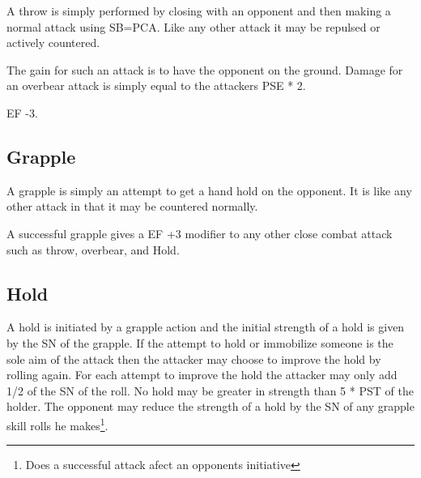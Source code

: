 A throw is simply performed by closing with an opponent and then 
making a normal attack using SB=PCA. Like any other attack it may be 
repulsed or actively countered.

The gain for such an attack is to have the opponent on the ground.
Damage for an overbear attack is simply equal to the attackers 
PSE * 2. 

EF -3.

\subsection{Grapple}

A grapple is simply an attempt to get a hand hold on the opponent. 
It is like any other attack in that it may be countered normally.

A successful grapple gives a EF +3 modifier to any other close combat 
attack such as throw, overbear, and Hold.

\subsection{Hold}

A hold is initiated by a grapple action and the initial strength of a
hold is given by the SN of the grapple. If the attempt to hold or 
immobilize someone is the sole aim of the attack then the attacker 
may choose to improve the hold by rolling again. For each attempt to 
improve the hold the attacker may only add 1/2 of the SN of the roll. 
No hold may be greater in strength than 5 * PST of the holder.
The opponent may reduce the strength of a hold by the SN of any 
grapple skill rolls he makes\footnote{Does a successful attack afect 
an opponents initiative}.




